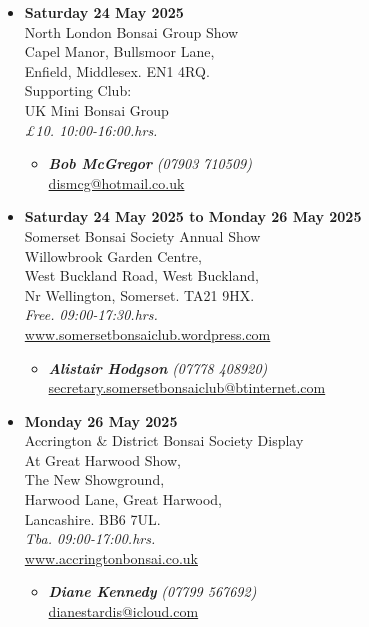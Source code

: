 \begin{itemize}
    \item \textbf{Saturday 24 May 2025}
    \\
    North London Bonsai Group Show \\
    Capel Manor, Bullsmoor Lane, \\
    Enfield, Middlesex. EN1 4RQ. \\
    Supporting Club: \\
    UK Mini Bonsai Group
    \\
    \emph{£10. 10:00-16:00.hrs.}
    \begin{itemize}
        \item \textbf{\emph{Bob McGregor}} \emph{(07903 710509)} \\
        \href{mailto:dismcg@hotmail.co.uk}{dismcg@hotmail.co.uk} 
    \end{itemize}

    \item \textbf{Saturday 24 May 2025 to Monday 26 May 2025}
    \\
    Somerset Bonsai Society Annual Show \\
    Willowbrook Garden Centre, \\
    West Buckland Road, West Buckland, \\
    Nr Wellington, Somerset. TA21 9HX.
    \\
    \emph{Free. 09:00-17:30.hrs.}
    \\
    \href{http://www.somersetbonsaiclub.wordpress.com/}{www.somersetbonsaiclub.wordpress.com}
    \begin{itemize}
        \item \textbf{\emph{Alistair Hodgson}} \emph{(07778 408920)} \\
        \href{mailto:secretary.somersetbonsaiclub@btinternet.com}{secretary.somersetbonsaiclub@btinternet.com} 
    \end{itemize}

    \item \textbf{Monday 26 May 2025}
    \\
    Accrington \& District Bonsai Society Display \\
    At Great Harwood Show, \\
    The New Showground, \\
    Harwood Lane, Great Harwood, \\
    Lancashire. BB6 7UL.
    \\
    \emph{Tba. 09:00-17:00.hrs.}
    \\
    \href{https://www.accringtonbonsai.co.uk}{www.accringtonbonsai.co.uk}
    \begin{itemize}
        \item \textbf{\emph{Diane Kennedy}} \emph{(07799 567692)} \\
        \href{mailto:dianestardis@icloud.com}{dianestardis@icloud.com} 
    \end{itemize}


\end{itemize}
